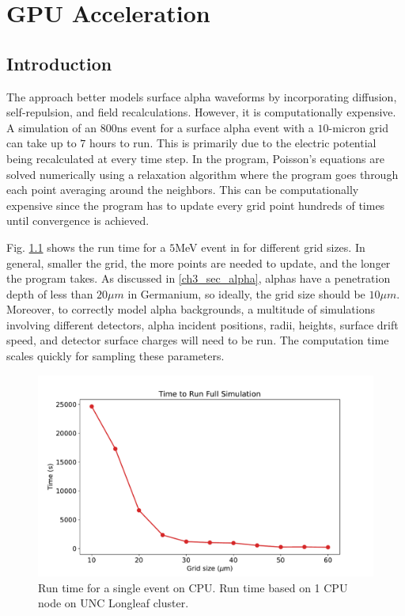 \chapter{GPU Acceleration}
\label{chap4:gpu}

\section{Introduction}
The {\ehd} approach better models surface alpha waveforms by incorporating diffusion, self-repulsion, and field recalculations. However, it is computationally expensive. A simulation of an $800$ns event for a surface alpha event with a $10$-micron grid can take up to $7$ hours to run. This is primarily due to the electric potential being recalculated at every time step. In the program, Poisson's equations are solved numerically using a relaxation algorithm where the program goes through each point averaging around the neighbors. This can be computationally expensive since the program has to update every grid point hundreds of times until convergence is achieved. 

Fig. \ref{fig:CPU_time} shows the run time for a $5$MeV event in {\ehd} for different grid sizes. In general, smaller the grid, the more points are needed to update, and the longer the program takes. As discussed in \ref{ch3_sec_alpha}, alphas have a penetration depth of less than $20 \mu m$ in Germanium, so ideally, the grid size should be $10 \mu m$. Moreover, to correctly model alpha backgrounds, a multitude of simulations involving different detectors, alpha incident positions, radii, heights, surface drift speed, and detector surface charges will need to be run. The computation time scales quickly for sampling these parameters.

\begin{figure}
\centering
 \includegraphics[width=0.99\linewidth]{ch4/figs/cpu_run_time.pdf}
\caption{Run time for a single {\ehd} event on CPU. Run time based on 1 CPU node on UNC Longleaf cluster.}
\label{fig:CPU_time}
\end{figure}

